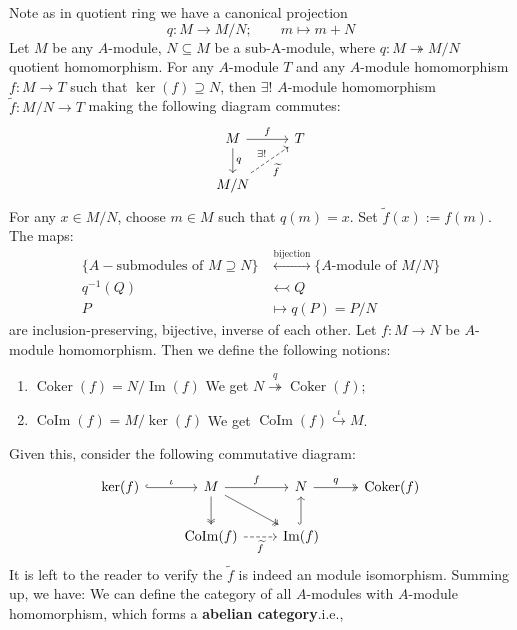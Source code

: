 \documentclass[12pt]{article}
\theoremstyle{definition}
\theoremstyle{plain}
\DeclareMathOperator{\im}{Im}
\DeclareMathOperator{\Coker}{Coker}
\DeclareMathOperator{\CoIm}{CoIm}
\renewcommand{\tilde}{\widetilde}
\begin{document}
\Rmk Note as in quotient ring we have a canonical projection $$q:M\to M/N;\qquad m\mapsto m+N$$
 Let $M$ be any $A$-module, $N\subseteq M$ be a sub-A-module, where $q:M\twoheadrightarrow M/N$ quotient homomorphism. For any $A$-module $T$ and any $A$-module homomorphism $f:M\to T$ such that $\ker(f)\supseteq N$, then $\exists ! $ $A$-module homomorphism $\tilde{f}: M/N\to T$ making the following diagram commutes:
\begin{equation}
  \begin{tikzcd}
    M\ar{r}{f} \ar{d}{q} & T\\
    M/N \ar[dashed]{ru}{\exists!}[swap]{\tilde{f}}
  \end{tikzcd}
\end{equation}
\proof For any $x\in M/N$, choose $m\in M$ such that $q(m)=x$. Set $\tilde{f}(x):=f(m)$.
\Prop The maps:
\begin{align*}
  \{A-\text{submodules of }M\supseteq N\}&\overset{\text{bijection}}{\longleftrightarrow}\{A\text{-module of }M/N\}\\
  q^{-1}(Q)&\leftarrowtail Q\\
  P&\mapsto q(P)=P/N
\end{align*}
are inclusion-preserving, bijective, inverse of each other.
\Def Let $f:M\to N$ be $A$-module homomorphism. Then we define the following notions:
\begin{enumerate}
  \item $\Coker(f)=N/\im(f)$ We get $N\overset{q}{\twoheadrightarrow} \Coker(f)$;
  \item $\CoIm(f)=M/\ker(f)$ We get $\CoIm(f)\overset{\iota}{\hookrightarrow} M$.
\end{enumerate}
Given this, consider the following commutative diagram:
\begin{equation}
  \begin{tikzcd}
    \ker(f)\ar[hook]{r}{\iota} &M\ar{r}{f} \ar[two heads]{d}\ar[two heads]{rd} &N\ar[two heads]{r}{q} &\Coker(f)\\
    & \CoIm(f)\ar[dashed]{r}[swap]{\tilde{f}} & \im(f)\ar[hook]{u}
  \end{tikzcd}
\end{equation}
It is left to the reader to verify the $\tilde{f}$ is indeed an module isomorphism. Summing up, we have:
\Def We can define the category of all $A$-modules with $A$-module homomorphism, which forms a \textbf{abelian category}.i.e.,
\end{document}
